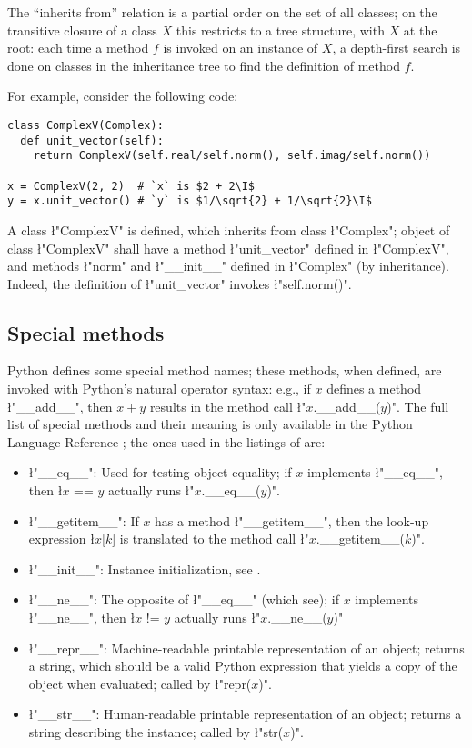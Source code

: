 The ``inherits from'' relation is a partial order on the set of all
classes; on the transitive closure of a class $X$ this restricts to a
tree structure, with $X$ at the root: each time a method $f$ is
invoked on an instance of $X$, a depth-first search is done on classes
in the inheritance tree to find the definition of method $f$.

For example, consider the following code:
\begin{lstlisting}
class ComplexV(Complex):
  def unit_vector(self):
    return ComplexV(self.real/self.norm(), self.imag/self.norm())

x = ComplexV(2, 2)  # `x` is $2 + 2\I$
y = x.unit_vector() # `y` is $1/\sqrt{2} + 1/\sqrt{2}\I$
\end{lstlisting}
A class \l"ComplexV" is defined, which inherits from class
\l"Complex"; object of class \l"ComplexV" shall have a method
\l"unit_vector" defined in \l"ComplexV", and  methods \l"norm" and
\l"__init__" defined in \l"Complex" (by inheritance).  Indeed, the
definition of \l"unit_vector" invokes \l"self.norm()".

\subsection{Special methods}
\label{sec:special-methods}

Python defines some special method names; these methods, when defined,
are invoked with Python's natural operator syntax: e.g., if $x$
defines a method \l"__add__", then $x + y$ results in the method call
\l"$x$.__add__($y$)".  The full list of special methods and their
meaning is only available in the Python Language Reference
\cite{python:reference}; the ones used in the listings of
 are:
\begin{itemize}
\item[] \l"__eq__": Used for testing object equality; if $x$ implements
  \l"__eq__", then \l{$x$ == $y$} actually runs \l"$x$.__eq__($y$)".
\item[] \l"__getitem__": If $x$ has a method \l"__getitem__", then the
  look-up expression \l{$x$[$k$]} is translated to the method call
  \l"$x$.__getitem__($k$)".
\item[] \l"__init__": Instance initialization, see .
\item[] \l"__ne__": The opposite of \l"__eq__" (which see); if $x$
  implements \l"__ne__", then \l{$x$ != $y$} actually runs
  \l"$x$.__ne__($y$)"
\item[] \l"__repr__": Machine-readable printable representation of an
  object; returns a string, which should be a valid Python expression
  that yields a copy of the object when evaluated; called by
  \l"repr($x$)".
\item[] \l"__str__": Human-readable printable representation of an
  object; returns a string describing the instance; called by
  \l"str($x$)".
\end{itemize}


